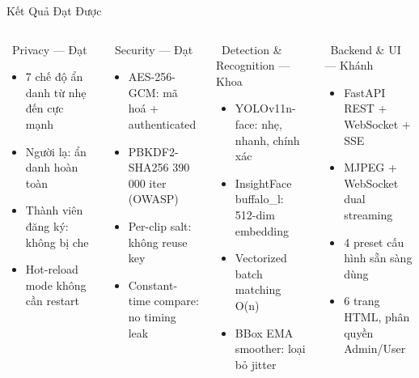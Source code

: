 \documentclass[aspectratio=169, 11pt]{beamer}
\newcommand{\cmark}{\textcolor{darkgreen}{\ding{51}}}
\begin{document}
\begin{frame}{Kết Quả Đạt Được}
\begin{columns}[T]
\begin{block}{\cmark\ Privacy --- Đạt}
\begin{itemize}\footnotesize
  \item 7 chế độ ẩn danh từ nhẹ đến cực mạnh
  \item Người lạ: ẩn danh hoàn toàn
  \item Thành viên đăng ký: không bị che
  \item Hot-reload mode không cần restart
\end{itemize}
\end{block}
\begin{block}{\cmark\ Security --- Đạt}
\begin{itemize}\footnotesize
  \item AES-256-GCM: mã hoá + authenticated
  \item PBKDF2-SHA256 390\,000 iter (OWASP)
  \item Per-clip salt: không reuse key
  \item Constant-time compare: no timing leak
\end{itemize}
\end{block}
\begin{block}{\cmark\ Detection \& Recognition --- Khoa}
\begin{itemize}\footnotesize
  \item YOLOv11n-face: nhẹ, nhanh, chính xác
  \item InsightFace buffalo\_l: 512-dim embedding
  \item Vectorized batch matching O(n)
  \item BBox EMA smoother: loại bỏ jitter
\end{itemize}
\end{block}
\begin{block}{\cmark\ Backend \& UI --- Khánh}
\begin{itemize}\footnotesize
  \item FastAPI REST + WebSocket + SSE
  \item MJPEG + WebSocket dual streaming
  \item 4 preset cấu hình sẵn sàng dùng
  \item 6 trang HTML, phân quyền Admin/User
\end{itemize}
\end{block}
\end{columns}
\end{frame}
\end{document}
